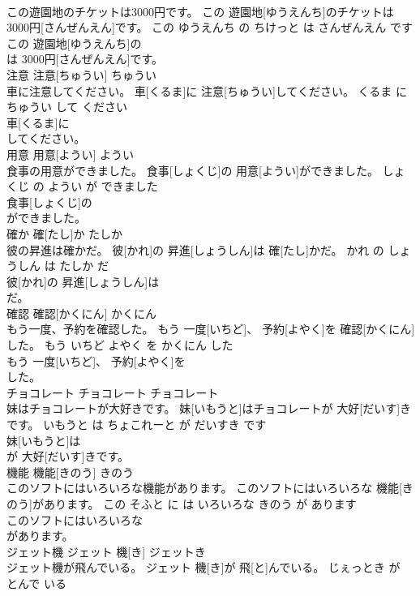 \documentclass[8pt]{extreport}
\begin{document}
\begin{CJK}{UTF8}{min}
\\	この遊園地のチケットは3000円です。	この 遊園地[ゆうえんち]のチケットは 3000円[さんぜんえん]です。	この ゆうえんち の ちけっと は さんぜんえん です	
\\	この 遊園地[ゆうえんち]の
\\	は 3000円[さんぜんえん]です。			
\\	注意	注意[ちゅうい]	ちゅうい	
\\	車に注意してください。	車[くるま]に 注意[ちゅうい]してください。	くるま に ちゅうい して ください	
\\	車[くるま]に
\\	してください。			
\\	用意	用意[ようい]	ようい	
\\	食事の用意ができました。	食事[しょくじ]の 用意[ようい]ができました。	しょくじ の ようい が できました	
\\	食事[しょくじ]の
\\	ができました。			
\\	確か	確[たし]か	たしか	
\\	彼の昇進は確かだ。	彼[かれ]の 昇進[しょうしん]は 確[たし]かだ。	かれ の しょうしん は たしか だ	
\\	彼[かれ]の 昇進[しょうしん]は
\\	だ。			
\\	確認	確認[かくにん]	かくにん	
\\	もう一度、予約を確認した。	もう 一度[いちど]、 予約[よやく]を 確認[かくにん]した。	もう いちど よやく を かくにん した	
\\	もう 一度[いちど]、 予約[よやく]を
\\	した。			
\\	チョコレート	チョコレート	チョコレート	
\\	妹はチョコレートが大好きです。	妹[いもうと]はチョコレートが 大好[だいす]きです。	いもうと は ちょこれーと が だいすき です	
\\	妹[いもうと]は
\\	が 大好[だいす]きです。			
\\	機能	機能[きのう]	きのう	
\\	このソフトにはいろいろな機能があります。	このソフトにはいろいろな 機能[きのう]があります。	この そふと に は いろいろな きのう が あります	
\\	このソフトにはいろいろな
\\	があります。			
\\	ジェット機	ジェット 機[き]	ジェットき	
\\	ジェット機が飛んでいる。	ジェット 機[き]が 飛[と]んでいる。	じぇっとき が とんで いる	

\end{CJK}
\end{document}
